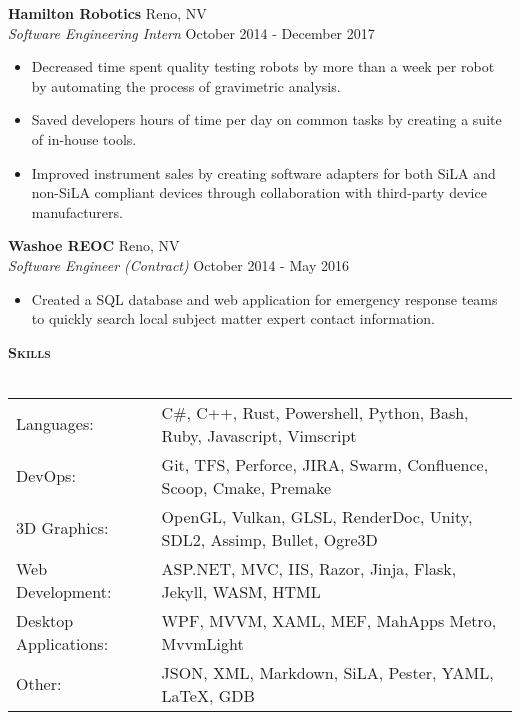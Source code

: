 \documentclass[a4paper]{article}
\newcommand{\lineunder} {
    \vspace*{-8pt} \\
    \hspace*{-18pt} \hrulefill \\
}
\newcommand{\header} [1] {
    {\hspace*{-18pt}\vspace*{6pt} \large \textbf{\textsc{#1}}}
    \vspace*{-6pt} \lineunder
    \vspace*{4pt}
}
\begin{document}
\textbf{Hamilton Robotics} \hfill Reno, NV\\
\textit{Software Engineering Intern} \hfill October 2014 - December 2017\\
\vspace{-1mm}
\begin{itemize} \itemsep 1pt
	\item Decreased time spent quality testing robots by more than a week per robot by automating the process of gravimetric analysis.
	\item Saved developers hours of time per day on common tasks by creating a suite of in-house tools.
	\item Improved instrument sales by creating software adapters for both SiLA and non-SiLA compliant devices through collaboration with third-party device manufacturers.
\end{itemize}
\textbf{Washoe REOC} \hfill Reno, NV\\
\textit{Software Engineer (Contract)} \hfill October 2014 - May 2016\\
\vspace{-1mm}
\begin{itemize} \itemsep 1pt
	\item Created a SQL database and web application for emergency response teams to quickly search local subject matter expert contact information.
\end{itemize}

\header{Skills}
\begingroup
\setlength{\tabcolsep}{5pt} %
\renewcommand{\arraystretch}{1.1} %
\begin{tabular}{ l l }
	Languages:            & C\#, C++, Rust, Powershell, Python, Bash, Ruby, Javascript, Vimscript  \strut  \\
	DevOps:               & Git, TFS, Perforce, JIRA, Swarm, Confluence, Scoop, Cmake, Premake \strut      \\
	3D Graphics:          & OpenGL, Vulkan, GLSL, RenderDoc, Unity, SDL2, Assimp, Bullet, Ogre3D \strut    \\
	Web Development:      & ASP.NET, MVC, IIS, Razor, Jinja, Flask, Jekyll, WASM, HTML \strut              \\
	Desktop Applications: & WPF, MVVM, XAML, MEF, MahApps Metro, MvvmLight \strut                               \\
	Other:                & JSON, XML, Markdown, SiLA, Pester, YAML, LaTeX, GDB \strut                     \\
\end{tabular}
\endgroup
\vspace{1mm}
\end{document}
